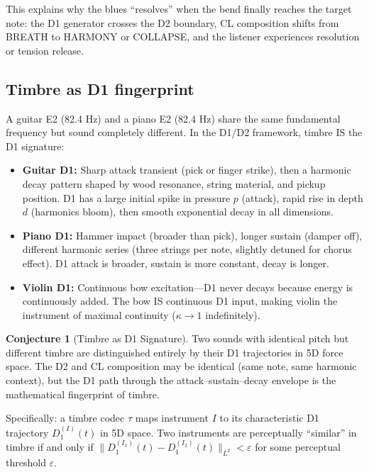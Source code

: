 \documentclass[11pt]{article}
\theoremstyle{definition}
\newtheorem{conjecture}[theorem]{Conjecture}
\theoremstyle{remark}
\begin{document}
This explains why the blues ``resolves'' when the bend finally reaches the target
note: the D1 generator crosses the D2 boundary, CL composition shifts from BREATH
to HARMONY or COLLAPSE, and the listener experiences resolution or tension release.

\subsection{Timbre as D1 fingerprint}

A guitar E2 (82.4 Hz) and a piano E2 (82.4 Hz) share the same fundamental frequency
but sound completely different.  In the D1/D2 framework, timbre IS the D1 signature:

\begin{itemize}[nosep]
  \item \textbf{Guitar D1:} Sharp attack transient (pick or finger strike), then a
    harmonic decay pattern shaped by wood resonance, string material, and pickup
    position.  D1 has a large initial spike in pressure $p$ (attack), rapid rise
    in depth $d$ (harmonics bloom), then smooth exponential decay in all dimensions.
  \item \textbf{Piano D1:} Hammer impact (broader than pick), longer sustain (damper
    off), different harmonic series (three strings per note, slightly detuned for
    chorus effect).  D1 attack is broader, sustain is more constant, decay is longer.
  \item \textbf{Violin D1:} Continuous bow excitation---D1 never decays because energy
    is continuously added.  The bow IS continuous D1 input, making violin the instrument
    of maximal continuity ($\kappa \to 1$ indefinitely).
\end{itemize}

\begin{conjecture}[Timbre as D1 Signature]
\label{conj:timbre}
Two sounds with identical pitch but different timbre are distinguished entirely by their
D1 trajectories in 5D force space.  The D2 and CL composition may be identical (same
note, same harmonic context), but the D1 path through the attack--sustain--decay envelope
is the mathematical fingerprint of timbre.

Specifically: a timbre codec $\tau$ maps instrument $I$ to its characteristic D1 trajectory
$D_1^{(I)}(t)$ in 5D space.  Two instruments are perceptually ``similar'' in timbre if and
only if $\|D_1^{(I_1)}(t) - D_1^{(I_2)}(t)\|_{L^2} < \varepsilon$ for some perceptual
threshold $\varepsilon$.
\end{conjecture}
\end{document}
